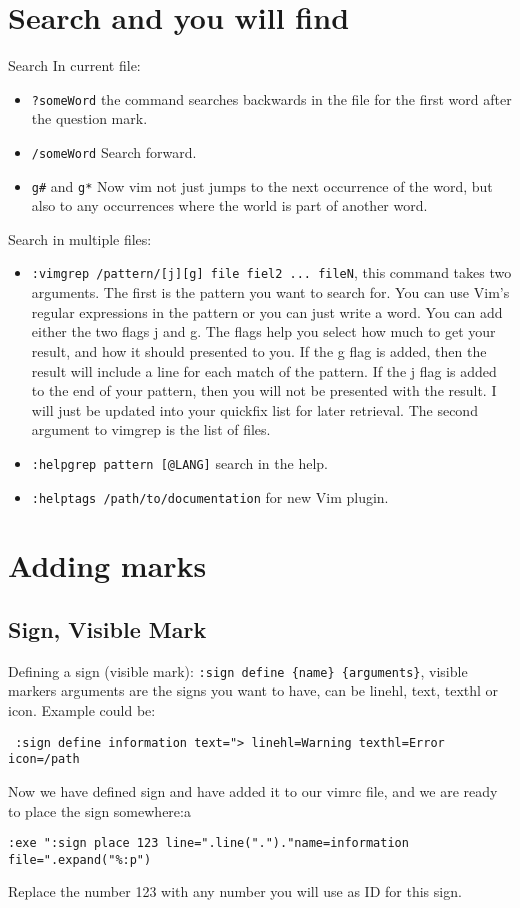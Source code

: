 \documentclass[11pt]{book}
\begin{document}
 \section{Search and you will find}
 Search In current file:
 \begin{itemize}
 \item \verb|?someWord| the command searches backwards in the file for the first
 word after the question mark.
 \item \verb|/someWord| Search forward.
 \item \verb|g#| and \verb|g*| Now vim not just jumps to the next occurrence of
 the word, but also to any occurrences where the world is part of another word.
 \end{itemize}
 Search in multiple files:
 \begin{itemize}
 \item \verb|:vimgrep /pattern/[j][g] file fiel2 ... fileN|, this command takes
 two arguments. The first is the pattern you want to search for. You can use
 Vim's regular expressions in the pattern or you can just write a word. You can
 add either the two flags j and g. The flags help you select how much to get
 your result, and how it should presented to you. If the g flag is added, then
 the result will include a line for each match of the pattern. If the j flag is
 added to the end of your pattern, then you will not be presented with the
 result. I will just be updated into your quickfix list for later retrieval. The
 second argument to vimgrep is the list of files.
 \item \verb|:helpgrep pattern [@LANG]| search in the help.
 \item \verb|:helptags /path/to/documentation| for new Vim plugin.
 \end{itemize}

 \section{Adding marks}
 \subsection{Sign, Visible Mark}
 Defining a sign (visible mark): \verb|:sign define {name} {arguments}|, visible
 markers arguments are the signs you want to have, can be linehl, text, texthl 
 or icon. Example could be:
 \begin{verbatim}
 :sign define information text="> linehl=Warning texthl=Error icon=/path
 \end{verbatim}
 Now we have defined sign and have added it to our vimrc file, and we are ready
 to place the sign somewhere:a
 \begin{verbatim}
:exe ":sign place 123 line=".line(".")."name=information file=".expand("%:p")
\end{verbatim}
Replace the number 123 with any number you will use as ID for this sign.
\end{document}
